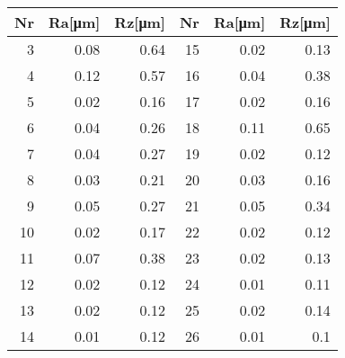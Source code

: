 \begin{tabular}{rrr|rrr}
    Nr & Ra[\si{\um}] & Rz[\si{\um}] & Nr & Ra[\si{\um}] & Rz[\si{\um}] \\ \hline
    3  & 0.08         & 0.64         & 15 & 0.02         & 0.13         \\
    4  & 0.12         & 0.57         & 16 & 0.04         & 0.38         \\
    5  & 0.02         & 0.16         & 17 & 0.02         & 0.16         \\
    6  & 0.04         & 0.26         & 18 & 0.11         & 0.65         \\
    7  & 0.04         & 0.27         & 19 & 0.02         & 0.12         \\
    8  & 0.03         & 0.21         & 20 & 0.03         & 0.16         \\
    9  & 0.05         & 0.27         & 21 & 0.05         & 0.34         \\
    10 & 0.02         & 0.17         & 22 & 0.02         & 0.12         \\
    11 & 0.07         & 0.38         & 23 & 0.02         & 0.13         \\
    12 & 0.02         & 0.12         & 24 & 0.01         & 0.11         \\
    13 & 0.02         & 0.12         & 25 & 0.02         & 0.14         \\
    14 & 0.01         & 0.12         & 26 & 0.01         & 0.1          \\
\end{tabular}

